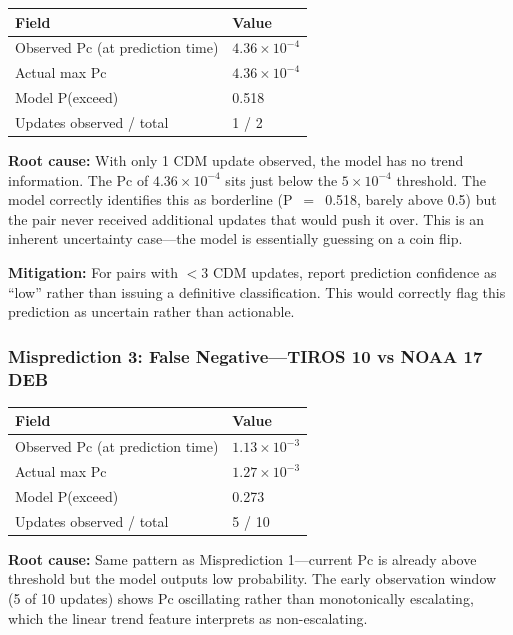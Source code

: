 \documentclass{article}
\begin{document}
\begin{table}[h]
\centering
\begin{tabular}{@{}ll@{}}
\toprule
Field & Value \\
\midrule
Observed Pc (at prediction time) & $4.36 \times 10^{-4}$ \\
Actual max Pc & $4.36 \times 10^{-4}$ \\
Model P(exceed) & 0.518 \\
Updates observed / total & 1 / 2 \\
\bottomrule
\end{tabular}
\end{table}

\textbf{Root cause:} With only 1 CDM update observed, the model has no trend information. The Pc of $4.36 \times 10^{-4}$ sits just below the $5 \times 10^{-4}$ threshold. The model correctly identifies this as borderline (P~$=$~0.518, barely above 0.5) but the pair never received additional updates that would push it over. This is an inherent uncertainty case---the model is essentially guessing on a coin flip.

\textbf{Mitigation:} For pairs with $< 3$ CDM updates, report prediction confidence as ``low'' rather than issuing a definitive classification. This would correctly flag this prediction as uncertain rather than actionable.

\subsubsection{Misprediction 3: False Negative---TIROS 10 vs NOAA 17 DEB}

\begin{table}[h]
\centering
\begin{tabular}{@{}ll@{}}
\toprule
Field & Value \\
\midrule
Observed Pc (at prediction time) & $1.13 \times 10^{-3}$ \\
Actual max Pc & $1.27 \times 10^{-3}$ \\
Model P(exceed) & 0.273 \\
Updates observed / total & 5 / 10 \\
\bottomrule
\end{tabular}
\end{table}

\textbf{Root cause:} Same pattern as Misprediction 1---current Pc is already above threshold but the model outputs low probability. The early observation window (5 of 10 updates) shows Pc oscillating rather than monotonically escalating, which the linear trend feature interprets as non-escalating.
\end{document}
